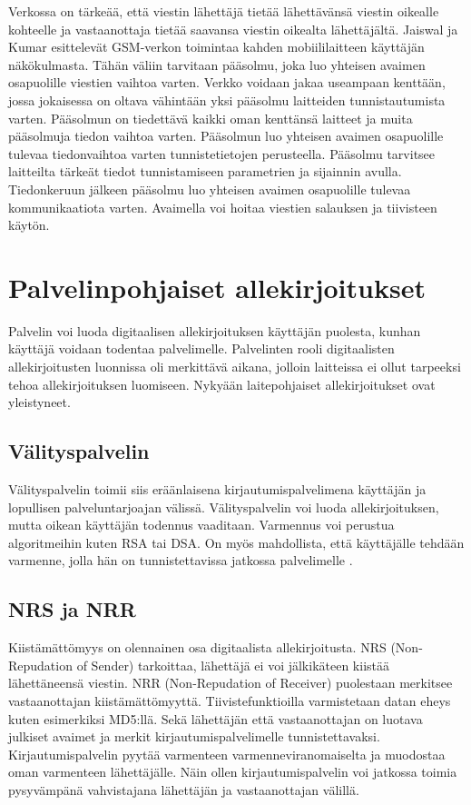 \documentclass[finnish]{tktltiki2}
\theoremstyle{definition}
\theoremstyle{remark}
\begin{document}
Verkossa on tärkeää, että viestin lähettäjä tietää lähettävänsä viestin oikealle kohteelle ja vastaanottaja tietää saavansa viestin oikealta lähettäjältä. Jaiswal ja Kumar \cite{cell} esittelevät GSM-verkon toimintaa kahden mobiililaitteen käyttäjän näkökulmasta. Tähän väliin tarvitaan pääsolmu, joka luo yhteisen avaimen osapuolille viestien vaihtoa varten. Verkko voidaan jakaa useampaan kenttään, jossa jokaisessa on oltava vähintään yksi pääsolmu laitteiden tunnistautumista varten. Pääsolmun on tiedettävä kaikki oman kenttänsä laitteet ja muita pääsolmuja tiedon vaihtoa varten. Pääsolmun luo yhteisen avaimen osapuolille tulevaa tiedonvaihtoa varten tunnistetietojen perusteella. Pääsolmu tarvitsee laitteilta tärkeät tiedot tunnistamiseen parametrien ja sijainnin avulla. Tiedonkeruun jälkeen pääsolmu luo yhteisen avaimen osapuolille tulevaa kommunikaatiota varten. Avaimella voi hoitaa viestien salauksen ja tiivisteen käytön.

\section{Palvelinpohjaiset allekirjoitukset}

Palvelin voi luoda digitaalisen allekirjoituksen käyttäjän puolesta, kunhan käyttäjä voidaan todentaa palvelimelle. Palvelinten rooli digitaalisten allekirjoitusten luonnissa oli merkittävä aikana, jolloin laitteissa ei ollut tarpeeksi tehoa allekirjoituksen luomiseen. Nykyään laitepohjaiset allekirjoitukset ovat yleistyneet. \cite{proxy}

\subsection{Välityspalvelin}

Välityspalvelin toimii siis eräänlaisena kirjautumispalvelimena käyttäjän ja lopullisen palveluntarjoajan välissä. Välityspalvelin voi luoda allekirjoituksen, mutta oikean käyttäjän todennus vaaditaan. Varmennus voi perustua algoritmeihin kuten RSA tai DSA. On myös mahdollista, että käyttäjälle tehdään varmenne, jolla hän on tunnistettavissa jatkossa palvelimelle \cite{proxy}.

\subsection{NRS ja NRR}

Kiistämättömyys on olennainen osa digitaalista allekirjoitusta. NRS (Non-Repudation of Sender) tarkoittaa, lähettäjä ei voi jälkikäteen kiistää lähettäneensä viestin. NRR (Non-Repudation of Receiver) puolestaan merkitsee vastaanottajan kiistämättömyyttä. Tiivistefunktioilla varmistetaan datan eheys kuten esimerkiksi MD5:llä. Sekä lähettäjän että vastaanottajan on luotava julkiset avaimet ja merkit kirjautumispalvelimelle tunnistettavaksi. Kirjautumispalvelin pyytää varmenteen varmenneviranomaiselta ja muodostaa oman varmenteen lähettäjälle. Näin ollen kirjautumispalvelin voi jatkossa toimia pysyvämpänä vahvistajana lähettäjän ja vastaanottajan välillä. \cite{gene}
\end{document}
